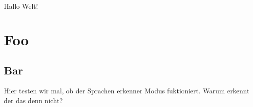 Hallo Welt!

\section{Foo}
\label{"waiting for reftex-label call..."}
\subsection{Bar}
\label{"waiting for reftex-label call..."}


Hier testen wir mal, ob der Sprachen erkenner Modus fuktioniert.
Warum erkennt der das denn nicht?
